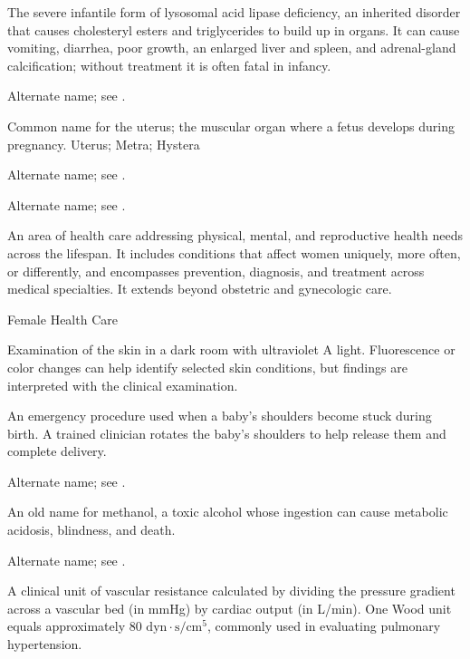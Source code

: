  The severe infantile form of lysosomal acid lipase deficiency, an inherited disorder that causes cholesteryl esters and triglycerides to build up in organs. It can cause vomiting, diarrhea, poor growth, an enlarged liver and spleen, and adrenal-gland calcification; without treatment it is often fatal in infancy.

 Alternate name; see .

 Common name for the uterus; the muscular organ where a fetus develops during pregnancy.
\synonyms
Uterus; Metra; Hystera

 Alternate name; see .

 Alternate name; see .

 An area of health care addressing physical, mental, and
reproductive health needs across the lifespan. It includes conditions that affect women
uniquely, more often, or differently, and encompasses prevention, diagnosis, and treatment
across medical specialties. It extends beyond obstetric and gynecologic care.

\synonyms
Female Health Care

 Examination of the skin in a dark room with ultraviolet A light. Fluorescence or color changes can help identify selected skin conditions, but findings are interpreted with the clinical examination.

 An emergency procedure used when a baby’s shoulders become stuck during birth. A trained clinician rotates the baby’s shoulders to help release them and complete delivery.

 Alternate name; see .

 An old name for methanol, a toxic alcohol whose ingestion can cause metabolic acidosis, blindness, and death.

 Alternate name; see .

 A clinical unit of vascular resistance calculated by dividing the pressure gradient across a vascular bed (in mmHg) by cardiac output (in L/min). One Wood unit equals approximately $80\text{ dyn}\cdot\text{s}/\text{cm}^5$, commonly used in evaluating pulmonary hypertension.

